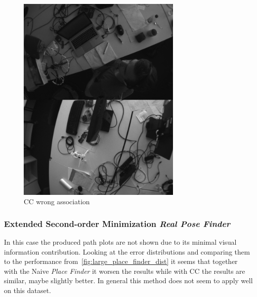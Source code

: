 \begin{figure}[htpb]
  \centering
  \includegraphics[width=8cm]{img/large_desktop/CC_wrong_asociation.png}
  \caption{CC wrong association}
  \label{fig:large_CC_wrong_asociation}
\end{figure}


\subsubsection{Extended Second-order Minimization \textit{Real Pose Finder}}
\label{ssub:extended_second_orther_minimization_real_pose_finder}

In this case the produced path plots are not shown due to its minimal visual information contribution. Looking at the error distributions and comparing them to the performance from~\ref{fig:large_place_finder_dist} it seems that together with the Naive \textit{Place Finder} it worsen the results while with CC the results are similar, maybe slightly better. In general this method does not seem to apply well on this dataset. \\

